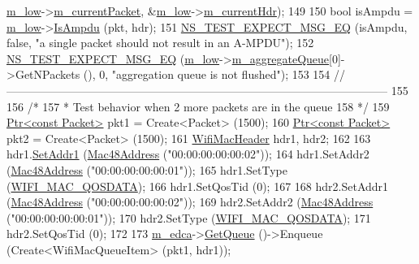 \begin{DoxyCode}
      \hyperlink{classAmpduAggregationTest_a65f2d8fbd8b46a92ace2c371d2a091d9}{m\_low}->\hyperlink{classns3_1_1MacLow_aa4f81bb523ceed1bbf5a84851b25e29c}{m\_currentPacket}, &\hyperlink{classAmpduAggregationTest_a65f2d8fbd8b46a92ace2c371d2a091d9}{m\_low}->\hyperlink{classns3_1_1MacLow_aec9902bc8026338baf261d2de8fcd83b}{m\_currentHdr});
149 
150   \textcolor{keywordtype}{bool} isAmpdu = \hyperlink{classAmpduAggregationTest_a65f2d8fbd8b46a92ace2c371d2a091d9}{m\_low}->\hyperlink{classns3_1_1MacLow_a228f675a7db0df0e39edb611167861cc}{IsAmpdu} (pkt, hdr);
151   \hyperlink{group__testing_ga7304ba46a28d8cf08dfdfd6499cf7068}{NS\_TEST\_EXPECT\_MSG\_EQ} (isAmpdu, \textcolor{keyword}{false}, \textcolor{stringliteral}{"a single packet should not result in an
       A-MPDU"});
152   \hyperlink{group__testing_ga7304ba46a28d8cf08dfdfd6499cf7068}{NS\_TEST\_EXPECT\_MSG\_EQ} (\hyperlink{classAmpduAggregationTest_a65f2d8fbd8b46a92ace2c371d2a091d9}{m\_low}->\hyperlink{classns3_1_1MacLow_a50ea30f5dff00a3ef2683b9275717c6f}{m\_aggregateQueue}[0]->GetNPackets 
      (), 0, \textcolor{stringliteral}{"aggregation queue is not flushed"});
153 
154   \textcolor{comment}{//-----------------------------------------------------------------------------------------------------}
155 
156   \textcolor{comment}{/*}
157 \textcolor{comment}{   * Test behavior when 2 more packets are in the queue}
158 \textcolor{comment}{   */}
159   \hyperlink{classns3_1_1Ptr}{Ptr<const Packet>} pkt1 = Create<Packet> (1500);
160   \hyperlink{classns3_1_1Ptr}{Ptr<const Packet>} pkt2 = Create<Packet> (1500);
161   \hyperlink{classns3_1_1WifiMacHeader}{WifiMacHeader} hdr1, hdr2;
162 
163   hdr1.\hyperlink{classns3_1_1WifiMacHeader_a6478a02b80d5c01657714c5c7a0ae1cb}{SetAddr1} (\hyperlink{classns3_1_1Mac48Address}{Mac48Address} (\textcolor{stringliteral}{"00:00:00:00:00:02"}));
164   hdr1.SetAddr2 (\hyperlink{classns3_1_1Mac48Address}{Mac48Address} (\textcolor{stringliteral}{"00:00:00:00:00:01"}));
165   hdr1.SetType (\hyperlink{namespacens3_a9318472db39b35b2092de5c721e6ab0aafd37aea1ac3edba5410fac6367b19b1d}{WIFI\_MAC\_QOSDATA});
166   hdr1.SetQosTid (0);
167 
168   hdr2.SetAddr1 (\hyperlink{classns3_1_1Mac48Address}{Mac48Address} (\textcolor{stringliteral}{"00:00:00:00:00:02"}));
169   hdr2.SetAddr2 (\hyperlink{classns3_1_1Mac48Address}{Mac48Address} (\textcolor{stringliteral}{"00:00:00:00:00:01"}));
170   hdr2.SetType (\hyperlink{namespacens3_a9318472db39b35b2092de5c721e6ab0aafd37aea1ac3edba5410fac6367b19b1d}{WIFI\_MAC\_QOSDATA});
171   hdr2.SetQosTid (0);
172 
173   \hyperlink{classAmpduAggregationTest_aa073b38b49ac92944de917cd25fe46f4}{m\_edca}->\hyperlink{classns3_1_1DcaTxop_a6c89d0aeccbc5e8724d404bc45f796d7}{GetQueue} ()->Enqueue (Create<WifiMacQueueItem> (pkt1, hdr1));

\end{DoxyCode}

